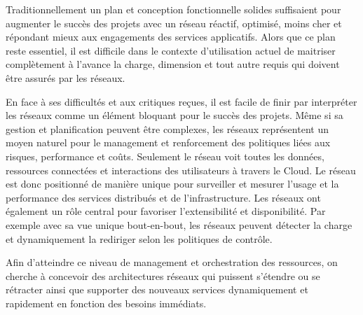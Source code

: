 
Traditionnellement un plan et conception fonctionnelle solides suffisaient pour augmenter le succès des projets avec un réseau réactif, optimisé, moins cher et répondant mieux aux engagements des services applicatifs. Alors que ce plan reste essentiel, il est difficile dans le contexte d'utilisation actuel de maitriser complètement  à l'avance la charge, dimension et tout autre requis qui doivent être assurés par les réseaux.

En face à ses difficultés et aux critiques reçues, il est facile  de finir par interpréter les réseaux comme un élément bloquant pour le succès des projets. Même si sa gestion et planification peuvent être complexes, les réseaux représentent un moyen naturel pour le management et renforcement des politiques liées aux risques, performance et coûts. Seulement le réseau voit toutes les données, ressources connectées et interactions des utilisateurs à travers le Cloud. Le réseau est donc positionné de manière unique pour surveiller et mesurer l'usage et la performance des services distribués et de l'infrastructure. Les réseaux ont également un rôle central pour favoriser l'extensibilité et disponibilité. Par exemple avec sa vue unique bout-en-bout, les réseaux peuvent détecter la charge et dynamiquement la rediriger selon les politiques de contrôle.

Afin d'atteindre ce niveau de management et orchestration des ressources, on cherche  à concevoir des architectures réseaux qui puissent s'étendre ou se rétracter ainsi que supporter des nouveaux services dynamiquement et rapidement  en fonction des besoins immédiats. \cite{ibmPlanningVirtCCchap4} \cite{cloudAutomation}


